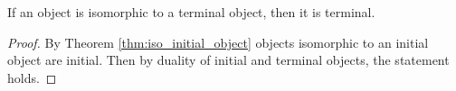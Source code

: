 \begin{theorem}
  If an object is isomorphic to a terminal object, then it is terminal.

  \begin{proof}
    By Theorem \ref{thm:iso_initial_object} objects isomorphic to an initial
    object are initial. Then by duality of initial and terminal objects, the
    statement holds.
  \end{proof}
\end{theorem}